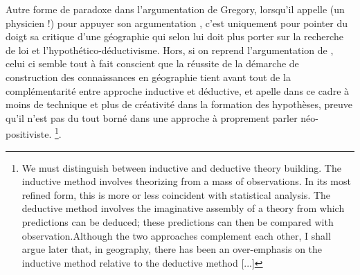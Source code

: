 Autre forme de paradoxe dans l'argumentation de Gregory, lorsqu'il appelle \textcite{Wilson1972} (un physicien !) pour appuyer son argumentation \autocite{Gregory1978}, c'est uniquement pour pointer du doigt sa critique d'une géographie qui selon lui doit plus porter sur la recherche de loi et l'hypothético-déductivisme. Hors, si on reprend l'argumentation de \textcite{Wilson1972}, celui ci semble tout à fait conscient que la réussite de la démarche de construction des connaissances en géographie tient avant tout de la complémentarité entre approche inductive et déductive, et apelle dans ce cadre à moins de technique et plus de créativité dans la formation des hypothèses, preuve qu'il n'est pas du tout borné dans une approche à proprement parler néo-positiviste. \footnote{ We must distinguish between inductive and deductive theory building. The inductive method involves theorizing from a mass of observations. In its most refined form, this is more or less coincident with statistical analysis. The deductive method involves the imaginative assembly of a theory from which predictions can be deduced; these predictions can then be compared with observation.Although the two approaches complement each other, I shall argue later that, in geography, there has been an over-emphasis on the inductive method relative to the deductive method [...] }.

